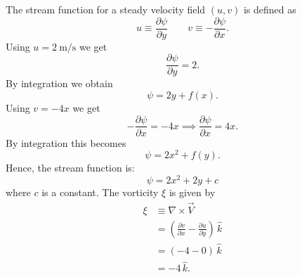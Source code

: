 \begin{derivation}
  The stream function for a steady velocity field $(u,v)$ is defined as
  \[ 
  u \equiv \frac{\partial \psi}{\partial y} \qquad v \equiv - \frac{\partial \psi}{\partial x} 
  .\]
  Using $u = \qty{2}{\m\per\s}$ we get
  \[ 
  \frac{\partial \psi}{\partial y} = 2
  .\]
  By integration we obtain
  \[ 
  \psi = 2y + f(x)
  .\]
  Using $v = - 4 x$ we get
  \[ 
  - \frac{\partial \psi}{\partial x} = -4x \implies \frac{\partial \psi}{\partial x} = 4x
  .\]
  By integration this becomes
  \[ 
  \psi = 2 x^2 + f(y)
  .\]
  Hence, the stream function is:
  \[ 
  \psi = 2x^2 + 2y + c
  \]
  where $c$ is a constant. 
  The vorticity $\xi$ is given by
  \begin{align*}
    \xi &\equiv \nabla \times \Vec{V} \\
        &= \left( \frac{\partial v}{\partial x} - \frac{\partial u}{\partial y}  \right) \, \hat{k} \\
        &= \left( -4 - 0 \right) \, \hat{k} \\
        &= -4 \, \hat{k}
  .\end{align*} 
\end{derivation}


